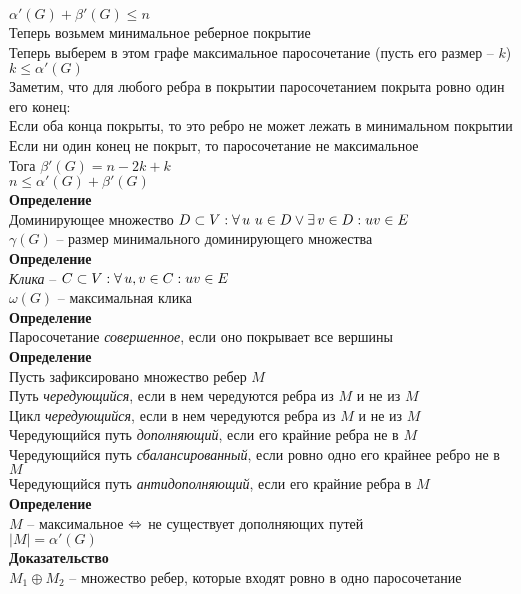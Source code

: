 \documentclass[12pt]{article}
\begin{document}
$\alpha'(G) + \beta'(G) \leq n$\\
Теперь возьмем минимальное реберное покрытие\\
Теперь выберем в этом графе максимальное паросочетание (пусть его размер -- $k$)\\
$k \leq \alpha'(G)$\\
Заметим, что для любого ребра в покрытии паросочетанием покрыта ровно один его конец:\\
Если оба конца покрыты, то это ребро не может лежать в минимальном покрытии\\
Если ни один конец не покрыт, то паросочетание не максимальное\\
Тога $\beta'(G) = n - 2k + k$\\
$n \leq \alpha'(G) + \beta'(G)$\\
\textbf{Определение}\\
Доминирующее множество $D \subset V: \fall u\ u\in D \lor \ex v\in D: uv \in E$\\
$\gamma(G)$ -- размер минимального доминирующего множества\\
\textbf{Определение}\\
\textit{Клика} -- $C\subset V: \forall\, u,v \in C: uv \in E$\\
$\omega(G)$ -- максимальная клика\\
\textbf{Определение}\\
Паросочетание \textit{совершенное}, если оно покрывает все вершины\\
\textbf{Определение}\\
Пусть зафиксировано множество ребер $M$\\
Путь \textit{чередующийся}, если в нем чередуются ребра из $M$ и не из $M$\\
Цикл \textit{чередующийся}, если в нем чередуются ребра из $M$ и не из $M$\\
Чередующийся путь \textit{дополняющий}, если его крайние ребра не в $M$\\
Чередующийся путь \textit{сбалансированный}, если ровно одно его крайнее ребро не в $M$\\
Чередующийся путь \textit{антидополняющий}, если его крайние ребра в $M$\\
\textbf{Определение}\\
$M$ -- максимальное $\Leftrightarrow$ не существует дополняющих путей\\
$|M| = \alpha'(G)$\\
\textbf{Доказательство}\\
$M_1 \oplus M_2$ -- множество ребер, которые входят ровно в одно паросочетание\\
\end{document}

